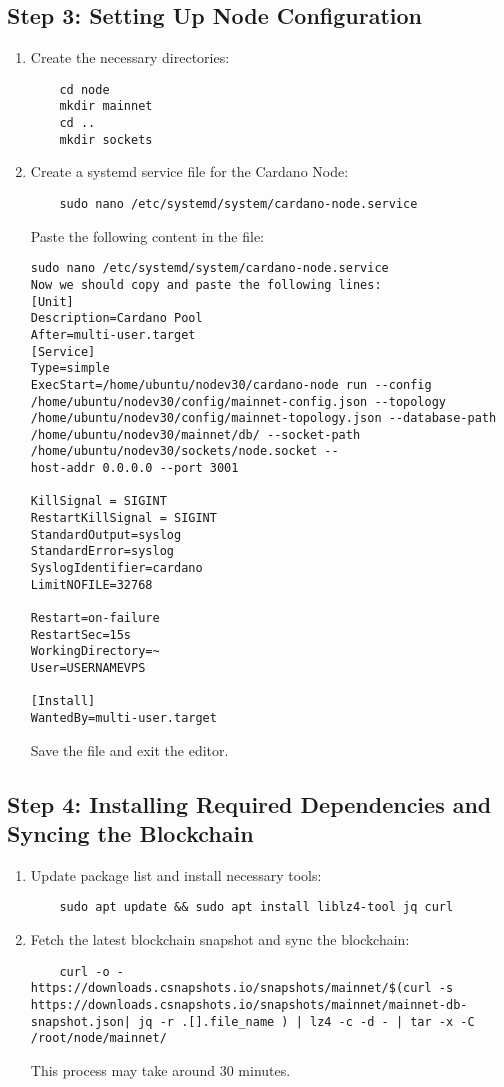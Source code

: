 \subsection{Step 3: Setting Up Node Configuration}
\begin{enumerate}
  \item Create the necessary directories:
        \begin{verbatim}
    cd node
    mkdir mainnet
    cd ..
    mkdir sockets
    \end{verbatim}
  \item Create a systemd service file for the Cardano Node:
        \begin{verbatim}
    sudo nano /etc/systemd/system/cardano-node.service
    \end{verbatim}

        Paste the following content in the file:

        \begin{verbatim}
sudo nano /etc/systemd/system/cardano-node.service
Now we should copy and paste the following lines:
[Unit]
Description=Cardano Pool
After=multi-user.target
[Service]
Type=simple
ExecStart=/home/ubuntu/nodev30/cardano-node run --config
/home/ubuntu/nodev30/config/mainnet-config.json --topology
/home/ubuntu/nodev30/config/mainnet-topology.json --database-path
/home/ubuntu/nodev30/mainnet/db/ --socket-path  /home/ubuntu/nodev30/sockets/node.socket --
host-addr 0.0.0.0 --port 3001

KillSignal = SIGINT
RestartKillSignal = SIGINT
StandardOutput=syslog
StandardError=syslog
SyslogIdentifier=cardano
LimitNOFILE=32768

Restart=on-failure
RestartSec=15s
WorkingDirectory=~
User=USERNAMEVPS

[Install]
WantedBy=multi-user.target
    \end{verbatim}

        Save the file and exit the editor.
\end{enumerate}

\subsection{Step 4: Installing Required Dependencies and Syncing the Blockchain}
\begin{enumerate}
  \item Update package list and install necessary tools:
        \begin{verbatim}
    sudo apt update && sudo apt install liblz4-tool jq curl
    \end{verbatim}
  \item Fetch the latest blockchain snapshot and sync the blockchain:
        \begin{verbatim}
    curl -o - https://downloads.csnapshots.io/snapshots/mainnet/$(curl -s https://downloads.csnapshots.io/snapshots/mainnet/mainnet-db-snapshot.json| jq -r .[].file_name ) | lz4 -c -d - | tar -x -C /root/node/mainnet/
    \end{verbatim}
        This process may take around 30 minutes.
\end{enumerate}

